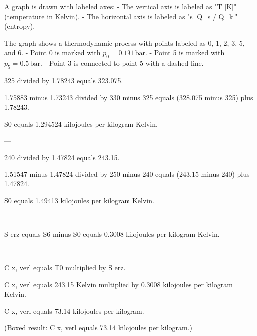 A graph is drawn with labeled axes:  
- The vertical axis is labeled as "T [K]" (temperature in Kelvin).  
- The horizontal axis is labeled as "s [Q_s / Q_k]" (entropy).  

The graph shows a thermodynamic process with points labeled as 0, 1, 2, 3, 5, and 6.  
- Point 0 is marked with \( p_0 = 0.191 \, \text{bar} \).  
- Point 5 is marked with \( p_5 = 0.5 \, \text{bar} \).  
- Point 3 is connected to point 5 with a dashed line.

325 divided by 1.78243 equals 323.075.  

1.75883 minus 1.73243 divided by 330 minus 325 equals (328.075 minus 325) plus 1.78243.  

S0 equals 1.294524 kilojoules per kilogram Kelvin.  

---

240 divided by 1.47824 equals 243.15.  

1.51547 minus 1.47824 divided by 250 minus 240 equals (243.15 minus 240) plus 1.47824.  

S0 equals 1.49413 kilojoules per kilogram Kelvin.  

---

S erz equals S6 minus S0 equals 0.3008 kilojoules per kilogram Kelvin.  

---

C x, verl equals T0 multiplied by S erz.  

C x, verl equals 243.15 Kelvin multiplied by 0.3008 kilojoules per kilogram Kelvin.  

C x, verl equals 73.14 kilojoules per kilogram.  

(Boxed result: C x, verl equals 73.14 kilojoules per kilogram.)